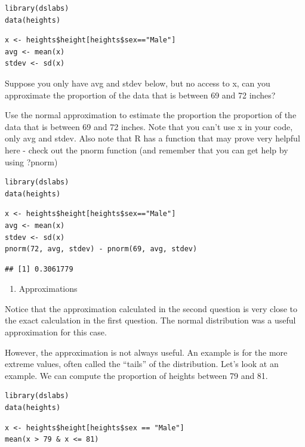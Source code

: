\documentclass[
]{article}
\providecommand{\tightlist}{%
  \setlength{\itemsep}{0pt}\setlength{\parskip}{0pt}}
\begin{document}
\begin{verbatim}
library(dslabs)  
data(heights)  
\end{verbatim}

\begin{verbatim}
x <- heights$height[heights$sex=="Male"]  
avg <- mean(x)  
stdev <- sd(x)  
\end{verbatim}

Suppose you only have avg and stdev below, but no access to x, can you
approximate the proportion of the data that is between 69 and 72 inches?

Use the normal approximation to estimate the proportion the proportion
of the data that is between 69 and 72 inches. Note that you can't use x
in your code, only avg and stdev. Also note that R has a function that
may prove very helpful here - check out the pnorm function (and remember
that you can get help by using ?pnorm)

\begin{verbatim}
library(dslabs)
data(heights)
\end{verbatim}

\begin{verbatim}
x <- heights$height[heights$sex=="Male"]
avg <- mean(x)
stdev <- sd(x)
pnorm(72, avg, stdev) - pnorm(69, avg, stdev)
\end{verbatim}

\begin{verbatim}
## [1] 0.3061779
\end{verbatim}

\begin{enumerate}
\def\labelenumi{\arabic{enumi}.}
\setcounter{enumi}{2}
\tightlist
\item
  Approximations
\end{enumerate}

Notice that the approximation calculated in the second question is very
close to the exact calculation in the first question. The normal
distribution was a useful approximation for this case.

However, the approximation is not always useful. An example is for the
more extreme values, often called the ``tails'' of the distribution.
Let's look at an example. We can compute the proportion of heights
between 79 and 81.

\begin{verbatim}
library(dslabs)  
data(heights)  
\end{verbatim}

\begin{verbatim}
x <- heights$height[heights$sex == "Male"]  
mean(x > 79 & x <= 81)  
\end{verbatim}
\end{document}
